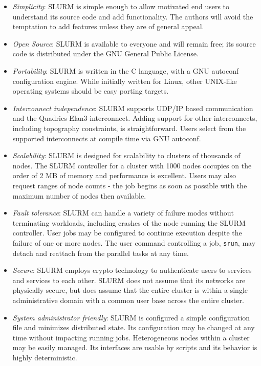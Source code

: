 \begin{itemize}
\item {\em Simplicity}: SLURM is simple enough to allow motivated end users
to understand its source code and add functionality.  The authors will 
avoid the temptation to add features unless they are of general appeal. 

\item {\em Open Source}: SLURM is available to everyone and will remain free;
its source code is distributed under the GNU General Public License.

\item {\em Portability}: SLURM is written in the C language, with a GNU 
autoconf configuration engine.  While initially written for Linux, 
other UNIX-like operating systems should be easy porting targets.

\item {\em Interconnect independence}: SLURM supports UDP/IP based
communication and the Quadrics Elan3 interconnect.  Adding support for other
interconnects, including topography constraints, is straightforward.  
Users select from the supported interconnects at compile time via GNU autoconf.

\item {\em Scalability}: SLURM is designed for scalability to clusters of
thousands of nodes.
The SLURM controller for a cluster with 1000 nodes occupies on the 
order of 2 MB of memory and performance is excellent. 
Users may also request ranges of node counts - the job begins as soon as 
possible with the maximum number of nodes then available.

\item {\em Fault tolerance}: SLURM can handle a variety of failure modes
without terminating workloads, including crashes of the node running 
the SLURM controller. 
User jobs may be configured to continue execution despite the failure 
of one or more nodes. 
The user  command controlling a job, {\tt srun}, may detach and reattach 
from the parallel tasks at any time.

\item {\em Secure}: SLURM employs crypto technology to authenticate 
users to services and services to each other.  
SLURM does not assume that its networks are physically secure, 
but does assume that the entire cluster is within a single 
administrative domain with a common user base across the 
entire cluster.

\item {\em System administrator friendly}: SLURM is configured a 
simple configuration file and minimizes distributed state.  
Its configuration may be changed at any time without impacting running jobs. 
Heterogeneous nodes within a cluster may be easily managed.
Its interfaces are usable by scripts and its behavior is highly 
deterministic.

\end{itemize}

